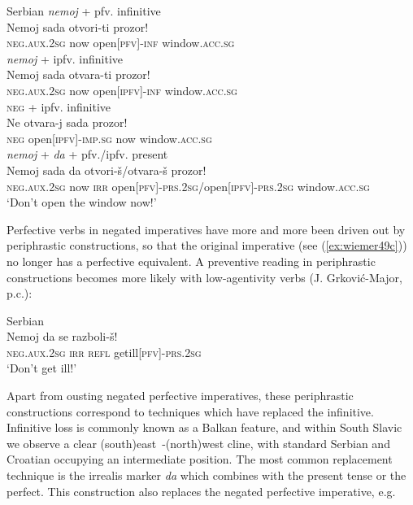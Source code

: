 \documentclass[output=paper,colorlinks,citecolor=brown]{langscibook}
\begin{document}
\ea \textnormal{Serbian}
\label{ex:wiemer49} 
\ea \label{ex:wiemer49a} \textnormal{\textit{nemoj} + pfv. infinitive} \\
\gll Nemoj sada otvori-ti prozor! \\
\textsc{neg.aux.2sg} now open\textsc{[pfv]-inf} window\textsc{.acc.sg} \\
\ex \label{ex:wiemer49b} \textnormal{\textit{nemoj} + ipfv. infinitive} \\
\gll Nemoj sada otvara-ti prozor! \\
\textsc{neg.aux.2sg} now open\textsc{[ipfv]-inf} window\textsc{.acc.sg} \\
\ex \label{ex:wiemer49c} \textnormal{\textsc{neg} + ipfv. infinitive} \\
\gll Ne otvara-j sada prozor! \\
\textsc{neg} open\textsc{[ipfv]-imp.sg} now window\textsc{.acc.sg} \\
\ex \label{ex:wiemer49d} \textnormal{\textit{nemoj} + \textit{da} + pfv./ipfv. present} \\
\gll Nemoj sada da otvori-š\textnormal{/}otvara-š prozor! \\
\textsc{neg.aux.2sg} now \textsc{irr} open\textsc{[pfv]-prs.2sg}/open\textsc{[ipfv]-prs.2sg} window\textsc{.acc.sg} \\
\glt `Don't open the window now!'
\z
\z


 Perfective verbs in negated imperatives have more and more been driven out by periphrastic constructions, so that the original imperative (see (\ref{ex:wiemer49c})) no longer has a perfective equivalent. A preventive reading in periphrastic constructions becomes more likely with low-agentivity verbs (J. Grković-Major, p.c.):


\ea \textnormal{Serbian} \\
\label{ex:wiemer50} 
\gll Nemoj da se razboli-š! \\
\textsc{neg.aux.2sg} \textsc{irr} \textsc{refl} get\textunderscore ill\textsc{[pfv]-prs.2sg} \\
\glt `Don't get ill!'
\z


 Apart from ousting negated perfective imperatives, these periphrastic constructions correspond to techniques which have replaced the infinitive. Infinitive loss is commonly known as a Balkan feature, and within South Slavic we observe a clear (south)east~-(north)west cline, with standard Serbian and Croatian occupying an intermediate position. The most common replacement technique is the irrealis marker \textit{da} which combines with the present tense or the perfect. This construction also replaces the negated perfective imperative, e.g.
\end{document}
